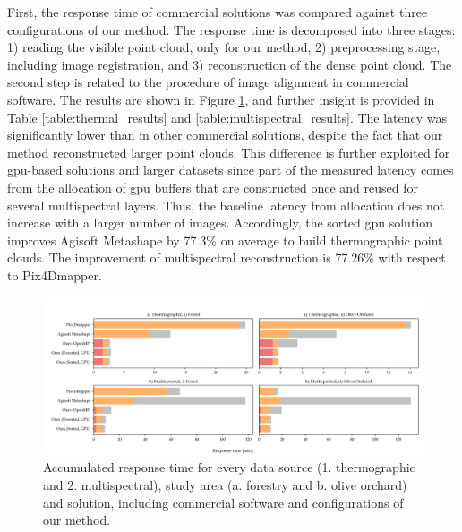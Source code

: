 First, the response time of commercial solutions was compared against three configurations of our method. The response time is decomposed into three stages: 1) reading the visible point cloud, only for our method, 2) preprocessing stage, including image registration, and 3) reconstruction of the dense point cloud. The second step is related to the procedure of image alignment in commercial software. The results are shown in Figure \ref{fig:occlusion_results_global_time}, and further insight is provided in Table \ref{table:thermal_results} and \ref{table:multispectral_results}. The latency was significantly lower than in other commercial solutions, despite the fact that our method reconstructed larger point clouds. This difference is further exploited for \acrshort{gpu}-based solutions and larger datasets since part of the measured latency comes from the allocation of \acrshort{gpu} buffers that are constructed once and reused for several multispectral layers. Thus, the baseline latency from allocation does not increase with a larger number of images. Accordingly, the sorted \acrshort{gpu} solution improves Agisoft Metashape by 77.3\% on average to build thermographic point clouds. The improvement of multispectral reconstruction is 77.26\% with respect to Pix4Dmapper. 

\begin{figure}[ht]
    \centering
    \includegraphics[width=\linewidth]{figs/multi_thermal_projection/results/stacked_global_time.png}
    \caption{Accumulated response time for every data source (1. thermographic and 2. multispectral), study area (a. forestry and b. olive orchard) and solution, including commercial software and configurations of our method. }
    \label{fig:occlusion_results_global_time}
\end{figure}

\newcommand\numExperiments{4}

